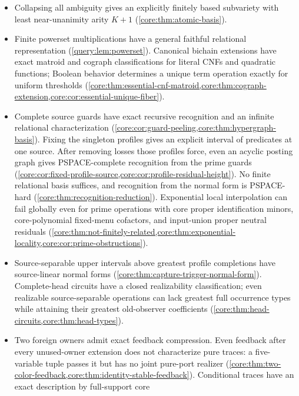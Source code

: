 \documentclass[11pt]{article}
\begin{document}
\begin{itemize}
profile fibers (\cref{core:thm:read-once-minimum}). At three inputs a
seven-leaf operation requires every variable repeatedly, and seven
leaves are optimal (\cref{core:prop:seven-leaf-branching}).
\item Collapsing all ambiguity gives an explicitly finitely based subvariety
with least near-unanimity arity $K+1$ (\cref{core:thm:atomic-basis}).
\item Finite powerset multiplications have a general faithful relational
representation (\cref{query:lem:powerset}). Canonical bichain extensions
have exact matroid and cograph classifications for literal CNFs and
quadratic functions; Boolean behavior determines a unique term operation
exactly for uniform thresholds
(\cref{core:thm:essential-cnf-matroid,core:thm:cograph-extension,core:cor:essential-unique-fiber}).
\item Complete source guards have exact recursive recognition and an
infinite relational characterization
(\cref{core:cor:guard-peeling,core:thm:hypergraph-basis}). Fixing the
singleton profiles gives an explicit interval of predicates at one source.
After removing losses those profiles force, even an acyclic posting graph
gives PSPACE-complete recognition from the prime guards
(\cref{core:cor:fixed-profile-source,core:cor:profile-residual-height}).
No finite relational basis suffices, and recognition from the normal
form is PSPACE-hard (\cref{core:thm:recognition-reduction}). Exponential local interpolation can fail
globally even for prime operations with core proper identification minors,
core-polynomial fixed-menu cofactors, and input-union proper neutral residuals
(\cref{core:thm:not-finitely-related,core:thm:exponential-locality,core:cor:prime-obstructions}).
\item Source-separable upper intervals above greatest profile completions
have source-linear normal forms (\cref{core:thm:capture-trigger-normal-form}).
Complete-head circuits have a closed realizability classification;
even realizable source-separable operations can lack greatest full
occurrence types while attaining their greatest old-observer coefficients
(\cref{core:thm:head-circuits,core:thm:head-types}).
\item Two foreign owners admit exact feedback compression. Even feedback
after every unused-owner extension does not characterize pure traces:
a five-variable tuple passes it but has no joint pure-port realizer
(\cref{core:thm:two-color-feedback,core:thm:identity-stable-feedback}).
Conditional traces have an exact description by full-support core

\end{itemize}
\end{document}
